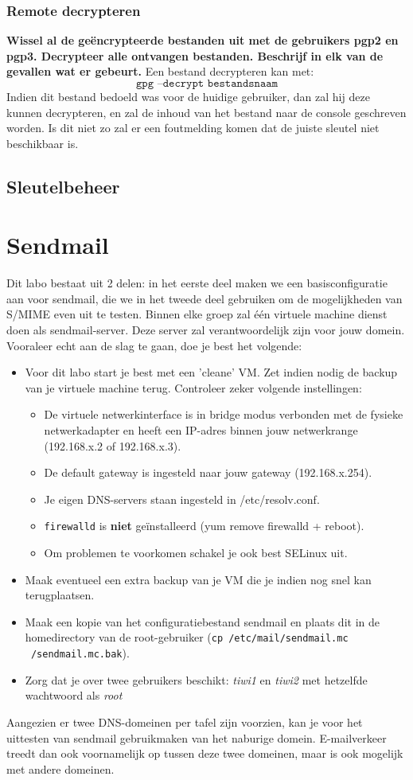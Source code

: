 \documentclass{report}
\begin{document}
\subsection{Remote decrypteren}
\textbf{Wissel al de geëncrypteerde bestanden uit met de gebruikers pgp2 en pgp3. Decrypteer alle ontvangen bestanden. Beschrijf in elk van de gevallen wat er gebeurt.}
Een bestand decrypteren kan met:
$$\texttt{gpg --decrypt bestandsnaam}$$
Indien dit bestand bedoeld was voor de huidige gebruiker, dan zal hij deze kunnen decrypteren, en zal de inhoud van het bestand naar de console geschreven worden. Is dit niet zo zal er een foutmelding komen dat de juiste sleutel niet beschikbaar is.

\section{Sleutelbeheer}

\chapter{Sendmail}
Dit labo bestaat uit 2 delen: in het eerste deel maken we een basisconfiguratie aan voor sendmail, die we in het tweede deel gebruiken om de mogelijkheden van S/MIME even uit te testen. Binnen elke groep zal één virtuele machine dienst doen als sendmail-server. Deze server zal verantwoordelijk zijn voor jouw domein. Vooraleer echt aan de slag te gaan, doe je best het volgende: 
\begin{itemize}
	\item Voor dit labo start je best met een 'cleane' VM. Zet indien nodig de backup van je virtuele machine terug. Controleer zeker volgende instellingen: 
	\begin{itemize}
		\item De virtuele netwerkinterface is in bridge modus verbonden met de fysieke netwerkadapter en heeft een IP-adres binnen jouw netwerkrange (192.168.x.2 of 192.168.x.3).
		\item De default gateway is ingesteld naar jouw gateway (192.168.x.254).
		\item Je eigen DNS-servers staan ingesteld in /etc/resolv.conf.
		\item \texttt{firewalld} is \textbf{niet} geïnstalleerd (yum remove firewalld + reboot).
		\item Om problemen te voorkomen schakel je ook best SELinux uit.
	\end{itemize}
	\item Maak eventueel een extra backup van je VM die je indien nog snel kan terugplaatsen.
	\item Maak een kopie van het configuratiebestand sendmail en plaats dit in de homedirectory van de root-gebruiker (\texttt{cp /etc/mail/sendmail.mc ~/sendmail.mc.bak}).
	\item Zorg dat je over twee gebruikers beschikt: \textit{tiwi1} en \textit{tiwi2} met hetzelfde wachtwoord als \textit{root}
\end{itemize}
Aangezien er twee DNS-domeinen per tafel zijn voorzien, kan je voor het uittesten van sendmail gebruikmaken van het naburige domein. E-mailverkeer treedt dan ook voornamelijk op tussen deze twee domeinen, maar is ook mogelijk met andere domeinen.
\end{document}
